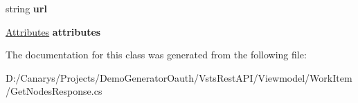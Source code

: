 \begin{DoxyCompactItemize}
\mbox{\label{class_vsts_rest_a_p_i_1_1_viewmodel_1_1_work_item_1_1_get_nodes_response_1_1_child1_a024f795fe2cb0f63d7f05ed119ada517}} 
string {\bfseries url}
\item 
\mbox{\label{class_vsts_rest_a_p_i_1_1_viewmodel_1_1_work_item_1_1_get_nodes_response_1_1_child1_a8d9508721f8e0c5e703f05f9e9b627d3}} 
\mbox{\hyperlink{class_vsts_rest_a_p_i_1_1_viewmodel_1_1_work_item_1_1_get_nodes_response_1_1_attributes}{Attributes}} {\bfseries attributes}
\end{DoxyCompactItemize}


The documentation for this class was generated from the following file\+:\begin{DoxyCompactItemize}
\item 
D\+:/\+Canarys/\+Projects/\+Demo\+Generator\+Oauth/\+Vsts\+Rest\+A\+P\+I/\+Viewmodel/\+Work\+Item/Get\+Nodes\+Response.\+cs\end{DoxyCompactItemize}
